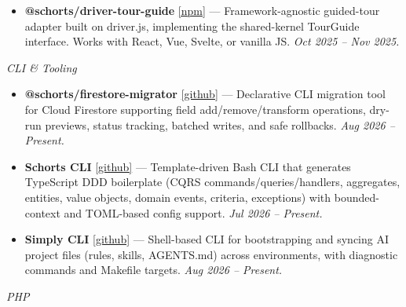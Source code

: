\documentclass[10.5pt,a4paper]{article}
\begin{document}
\begin{itemize}
  \item \textbf{@schorts/driver-tour-guide}
        \href{https://www.npmjs.com/package/@schorts/driver-tour-guide}{\small\color{muted}[npm]}
        --- Framework-agnostic guided-tour adapter built on driver.js, implementing the
        shared-kernel TourGuide interface. Works with React, Vue, Svelte, or vanilla JS.
        \textit{Oct 2025 -- Nov 2025.}
\end{itemize}

\vspace{4pt}
\noindent\textit{\small\color{muted}CLI \& Tooling}\vspace{3pt}

\begin{itemize}
  \item \textbf{@schorts/firestore-migrator}
        \href{https://github.com/schorts99/firestore-migrator}{\small\color{muted}[github]}
        --- Declarative CLI migration tool for Cloud Firestore supporting field
        add/remove/transform operations, dry-run previews, status tracking, batched writes,
        and safe rollbacks. \textit{Aug 2026 -- Present.}

  \item \textbf{Schorts CLI}
        \href{https://github.com/schorts99/schorts-cli}{\small\color{muted}[github]}
        --- Template-driven Bash CLI that generates TypeScript DDD boilerplate (CQRS
        commands/queries/handlers, aggregates, entities, value objects, domain events,
        criteria, exceptions) with bounded-context and TOML-based config support.
        \textit{Jul 2026 -- Present.}

  \item \textbf{Simply CLI}
        \href{https://github.com/schorts99/simply-cli}{\small\color{muted}[github]}
        --- Shell-based CLI for bootstrapping and syncing AI project files (rules, skills,
        AGENTS.md) across environments, with diagnostic commands and Makefile targets.
        \textit{Aug 2026 -- Present.}
\end{itemize}

\vspace{4pt}
\noindent\textit{\small\color{muted}PHP}\vspace{3pt}
\end{document}
